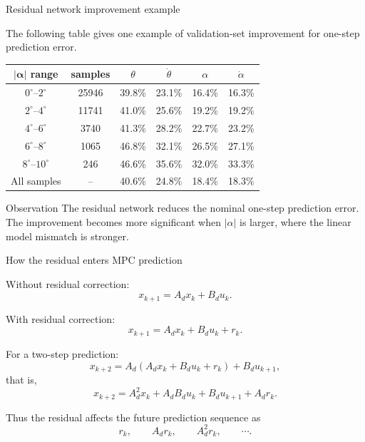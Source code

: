 \documentclass[aspectratio=169]{beamer}
\begin{document}
\begin{frame}{Residual network improvement example}

The following table gives one example of validation-set improvement
for one-step prediction error.

\vspace{0.1cm}

\begin{center}
\renewcommand{\arraystretch}{1.22}
\begin{tabular}{c|c|c|c|c|c}
\hline
\(\boldsymbol{|\alpha|}\) range
& samples
& \(\theta\)
& \(\dot{\theta}\)
& \(\alpha\)
& \(\dot{\alpha}\) \\
\hline
\(0^\circ\)--\(2^\circ\)
& 25946
& 39.8\%
& 23.1\%
& 16.4\%
& 16.3\% \\
\hline
\(2^\circ\)--\(4^\circ\)
& 11741
& 41.0\%
& 25.6\%
& 19.2\%
& 19.2\% \\
\hline
\(4^\circ\)--\(6^\circ\)
& 3740
& 41.3\%
& 28.2\%
& 22.7\%
& 23.2\% \\
\hline
\(6^\circ\)--\(8^\circ\)
& 1065
& 46.8\%
& 32.1\%
& 26.5\%
& 27.1\% \\
\hline
\(8^\circ\)--\(10^\circ\)
& 246
& 46.6\%
& 35.6\%
& 32.0\%
& 33.3\% \\
\hline
All samples
& --
& 40.6\%
& 24.8\%
& 18.4\%
& 18.3\% \\
\hline
\end{tabular}
\end{center}


\begin{block}{Observation}
\small
The residual network reduces the nominal one-step prediction error.
The improvement becomes more significant when \(|\alpha|\) is larger, where the linear model mismatch is stronger.
\end{block}

\end{frame}



\begin{frame}{How the residual enters MPC prediction}

Without residual correction:
\[
x_{k+1}=A_d x_k+B_d u_k.
\]

\vspace{0.15cm}

With residual correction:
\[
x_{k+1}=A_d x_k+B_d u_k+r_k.
\]

\vspace{0.15cm}

For a two-step prediction:
\[
x_{k+2}
=
A_d(A_d x_k+B_d u_k+r_k)+B_d u_{k+1},
\]
that is,
\[
x_{k+2}
=
A_d^2x_k+A_dB_du_k+B_du_{k+1}+A_dr_k.
\]

\vspace{0.15cm}

Thus the residual affects the future prediction sequence as
\[
r_k,\qquad A_dr_k,\qquad A_d^2r_k,\qquad \cdots .
\]

\vspace{0.12cm}


\end{frame}
\end{document}
